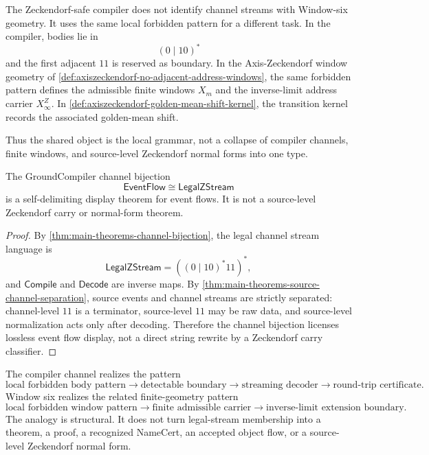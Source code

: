 \begin{principle}
\label{prin:visions-ground-channel-streaming-golden-mean-grammar}
The Zeckendorf-safe compiler does not identify channel streams with
Window-six geometry.  It uses the same local forbidden pattern for a
different task.  In the compiler, bodies lie in
$$
(0\mid10)^*
$$
and the first adjacent $11$ is reserved as boundary.  In the
Axis-Zeckendorf window geometry of
\autoref{def:axiszeckendorf-no-adjacent-address-windows}, the same
forbidden pattern defines the admissible finite windows $X_m$ and the
inverse-limit address carrier $X_\infty^Z$.  In
\autoref{def:axiszeckendorf-golden-mean-shift-kernel}, the transition
kernel records the associated golden-mean shift.

Thus the shared object is the local grammar, not a collapse of compiler
channels, finite windows, and source-level Zeckendorf normal forms into one
type.
\end{principle}

\begin{theorem}
\label{thm:visions-channel-bijection-not-source-zeckendorf-rewrite}
The GroundCompiler channel bijection
$$
\mathsf{EventFlow}\cong\mathsf{LegalZStream}
$$
is a self-delimiting display theorem for event flows.  It is not a
source-level Zeckendorf carry or normal-form theorem.
\end{theorem}

\begin{proof}
By \autoref{thm:main-theorems-channel-bijection}, the legal channel stream
language is
$$
\mathsf{LegalZStream}=((0\mid10)^*11)^*,
$$
and $\mathsf{Compile}$ and $\mathsf{Decode}$ are inverse maps.  By
\autoref{thm:main-theorems-source-channel-separation}, source events and
channel streams are strictly separated: channel-level $11$ is a terminator,
source-level $11$ may be raw data, and source-level normalization acts only
after decoding.  Therefore the channel bijection licenses lossless event
flow display, not a direct string rewrite by a Zeckendorf carry classifier.
\end{proof}

\begin{principle}
\label{prin:visions-boundary-recovery-pattern}
The compiler channel realizes the pattern
$$
\text{local forbidden body pattern}
\to
\text{detectable boundary}
\to
\text{streaming decoder}
\to
\text{round-trip certificate}.
$$
Window six realizes the related finite-geometry pattern
$$
\text{local forbidden window pattern}
\to
\text{finite admissible carrier}
\to
\text{inverse-limit extension boundary}.
$$
The analogy is structural.  It does not turn legal-stream membership into a
theorem, a proof, a recognized NameCert, an accepted object flow, or a
source-level Zeckendorf normal form.
\end{principle}

